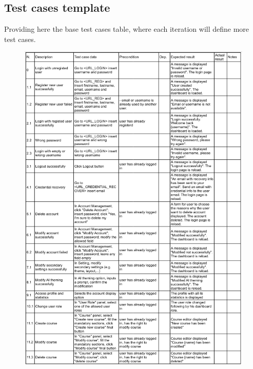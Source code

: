 \subsection{Test cases template}

Providing here the base test cases table, where each iteration will define more test cases.

\begin{figure}[H]
	\centering
	\includegraphics[width=1.0\linewidth]{images/test-case-1.png}
\end{figure}


